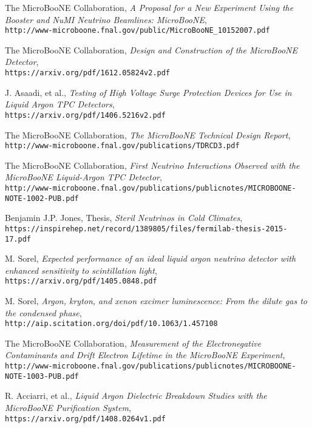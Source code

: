 \begin{thebibliography}{20}
  The MicroBooNE Collaboration, \emph{A Proposal for a New Experiment Using the Booster and NuMI Neutrino Beamlines: MicroBooNE},\\
  \texttt{http://www-microboone.fnal.gov/public/MicroBooNE\_10152007.pdf}

  The MicroBooNE Collaboration, \emph{Design and Construction of the MicroBooNE Detector},\\
  \texttt{https://arxiv.org/pdf/1612.05824v2.pdf}

  J. Asaadi, et al., \emph{Testing of High Voltage Surge Protection Devices for Use in Liquid Argon TPC Detectors}, \\
  \texttt{https://arxiv.org/pdf/1406.5216v2.pdf}

  The MicroBooNE Collaboration, \emph{The MicroBooNE Technical Design Report}, \\
  \texttt{http://www-microboone.fnal.gov/publications/TDRCD3.pdf}


  The MicroBooNE Collaboration, \emph{First Neutrino Interactions Observed with the MicroBooNE Liquid-Argon TPC Detector},\\
  \texttt{http://www-microboone.fnal.gov/publications/publicnotes/MICROBOONE-NOTE-1002-PUB.pdf}

  Benjamin J.P. Jones, Thesis, \emph{Steril Neutrinos in Cold Climates},\\
  \texttt{https://inspirehep.net/record/1389805/files/fermilab-thesis-2015-17.pdf}

  M. Sorel, \emph{Expected performance of an ideal liquid argon neutrino detector with enhanced sensitivity to scintillation light}, \\
  \texttt{https://arxiv.org/pdf/1405.0848.pdf}

  M. Sorel, \emph{Argon, kryton, and xenon excimer luminescence: From the dilute gas to the condensed phase}, \\
  \texttt{http://aip.scitation.org/doi/pdf/10.1063/1.457108}
  
  The MicroBooNE Collaboration, \emph{Measurement of the Electronegative Contaminants and Drift Electron Lifetime in the MicroBooNE Experiment},\\
  \texttt{http://www-microboone.fnal.gov/publications/publicnotes/MICROBOONE-NOTE-1003-PUB.pdf}

  R. Acciarri, et al., \emph{Liquid Argon Dielectric Breakdown Studies with the MicroBooNE Purification System}, \\
  \texttt{https://arxiv.org/pdf/1408.0264v1.pdf}
  

\end{thebibliography}
